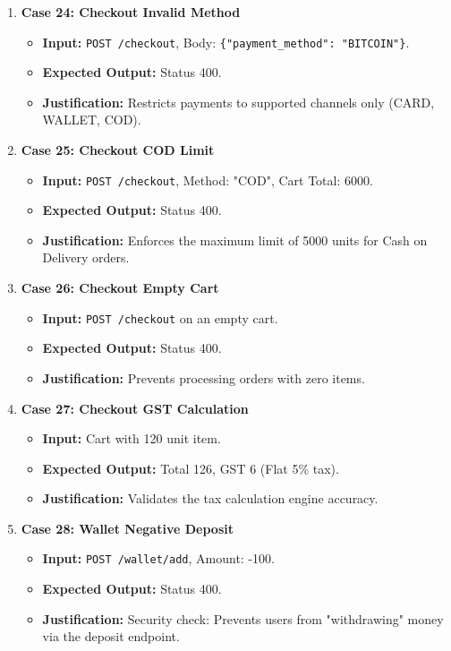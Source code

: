 \documentclass{article}
\begin{document}
\begin{enumerate}
    \item \textbf{Case 24: Checkout Invalid Method}
    \begin{itemize}
        \item \textbf{Input:} \texttt{POST /checkout}, Body: \texttt{\{"payment_method": "BITCOIN"\}}.
        \item \textbf{Expected Output:} Status 400.
        \item \textbf{Justification:} Restricts payments to supported channels only (CARD, WALLET, COD).
    \end{itemize}

    \item \textbf{Case 25: Checkout COD Limit}
    \begin{itemize}
        \item \textbf{Input:} \texttt{POST /checkout}, Method: "COD", Cart Total: 6000.
        \item \textbf{Expected Output:} Status 400.
        \item \textbf{Justification:} Enforces the maximum limit of 5000 units for Cash on Delivery orders.
    \end{itemize}

    \item \textbf{Case 26: Checkout Empty Cart}
    \begin{itemize}
        \item \textbf{Input:} \texttt{POST /checkout} on an empty cart.
        \item \textbf{Expected Output:} Status 400.
        \item \textbf{Justification:} Prevents processing orders with zero items.
    \end{itemize}

    \item \textbf{Case 27: Checkout GST Calculation}
    \begin{itemize}
        \item \textbf{Input:} Cart with 120 unit item.
        \item \textbf{Expected Output:} Total 126, GST 6 (Flat 5\% tax).
        \item \textbf{Justification:} Validates the tax calculation engine accuracy.
    \end{itemize}

    \item \textbf{Case 28: Wallet Negative Deposit}
    \begin{itemize}
        \item \textbf{Input:} \texttt{POST /wallet/add}, Amount: -100.
        \item \textbf{Expected Output:} Status 400.
        \item \textbf{Justification:} Security check: Prevents users from "withdrawing" money via the deposit endpoint.
    \end{itemize}


\end{enumerate}
\end{document}

